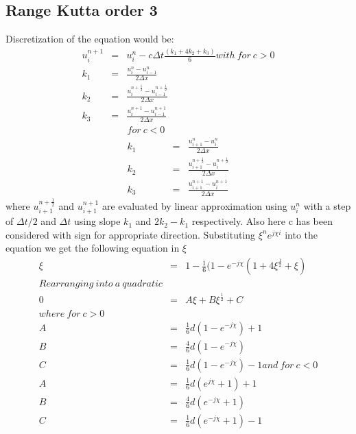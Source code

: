 \documentclass[a4paper,12pt]{report}
\begin{document}
\subsection{Range Kutta order 3}
Discretization of the equation would be:
\begin{eqnarray}
u^{n+1}_{i} &=& u^{n}_{i} - c\Delta t \frac{(k_1+4k_2+k_3)}{6} \nonumber
with\ for\ c>0 \nonumber\\
k_1 &=& \frac{u_{i}^{n} -u_{i-1}^{n}}{2\Delta x} \nonumber \\
k_2 &=& \frac{u_{i}^{n+\frac{1}{2}} -u_{i-1}^{n+\frac{1}{2}}}{2\Delta x} \nonumber\\
k_3 &=& \frac{u_{i}^{n+1} -u_{i-1}^{n+1}}{2\Delta x} \nonumber
\end{eqnarray}
\begin{eqnarray}
for\ c<0 \nonumber\\
k_1 &=& \frac{u_{i+1}^{n} -u_{i}^{n}}{2\Delta x} \nonumber \\
k_2 &=& \frac{u_{i+1}^{n+\frac{1}{2}} -u_{i}^{n+\frac{1}{2}}}{2\Delta x} \nonumber\\
k_3 &=& \frac{u_{i+1}^{n+1} -u_{i}^{n+1}}{2\Delta x} \nonumber
\end{eqnarray}
where $u_{i+1}^{n+\frac{1}{2}}$ and $u_{i+1}^{n+1}$ are evaluated by linear approximation using $u^{n}_{i}$ with a step of $\Delta t/2$ and $\Delta t$ using slope $k_1$ and $2k_2-k_1$ respectively. Also here c has been considered with sign for appropriate direction.
Substituting $\xi^{n}e^{j\chi i}$ into the equation we get the following equation in $\xi$\\
\begin{eqnarray}
\xi &=& 1- \frac{1}{6}(1-e^{-j\chi}(1+4\xi^\frac{1}{2} +\xi)\nonumber \\
Rearranging\ into\ a\ quadratic \nonumber \\
0 &=& A\xi+B\xi^{\frac{1}{2}} + C \label{uprk3}\\
where\ for\ c>0 \nonumber\\
A &=& \frac{1}{6}d(1-e^{-j\chi})+1  \nonumber\\
B &=& \frac{4}{6}d(1-e^{-j\chi}) \nonumber\\
C &=& \frac{1}{6}d(1-e^{-j\chi}) - 1 \nonumber
and\ for\ c<0 \nonumber\\
A &=& \frac{1}{6}d(e^{j\chi}+1)+1  \nonumber\\
B &=& \frac{4}{6}d(e^{-j\chi}+1) \nonumber\\
C &=& \frac{1}{6}d(e^{-j\chi}+1) - 1 \nonumber
\end{eqnarray}
\end{document}

